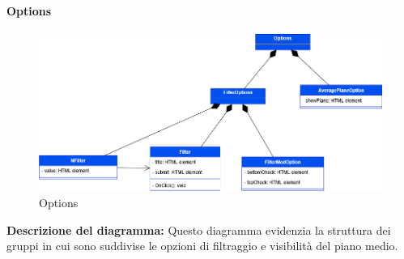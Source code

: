 \paragraph{Options}
\begin{figure}[h!] \centering
    \includegraphics[scale=0.45]{template/images/uml_front/ui/options.png}
    \caption{Options}
\end{figure}
\textbf{Descrizione del diagramma:}
Questo diagramma evidenzia la struttura dei gruppi in cui sono suddivise le opzioni di filtraggio e visibilità del piano medio.
